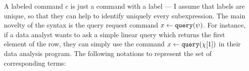 % 
%
 A labeled command $c$ is just a command with a label --- I assume that labels are unique, so that they can help to identify uniquely every subexpression. 
 The main novelty of the syntax is the query request command $\mathrel{ x \leftarrow {\tt query}(\psi) }$. 
 For instance, if a data analyst wants to ask a simple linear query which returns the first element of the row, 
 they can simply use the command $ \mathrel{ x \leftarrow {\tt query}(\chi[1]) }$ in their data analysis program.
%
The following notations to represent the set of corresponding terms:
